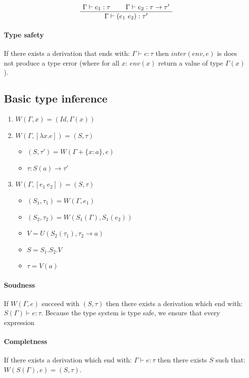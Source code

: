 \documentclass[a4paper]{report}
\newcommand{\ax}[1]%
{\AxiomC{$#1$}}
\newcommand{\bic}[1]%
{\BinaryInfC{$#1$}}
\newcommand{\drule}%
{\DisplayProof}
\begin{document}
\begin{equation}
\ax{\Gamma\vdash e_1:\tau}
\ax{\Gamma\vdash e_2:\tau\to\tau'}
\bic{\Gamma\vdash (e_1~e_2):\tau'}
\drule
\end{equation}

\paragraph{Type safety} If there exists a derivation that ends with: $\Gamma\vdash e:\tau$ then $inter(env,e)$ is does not produce a type error (where for all $x$: $env(x)$ return a value of type $\Gamma(x)$).

\subsection{Basic type inference}

\begin{enumerate}
\item $W(\Gamma,x)=(Id,\Gamma(x))$
\item $W(\Gamma,[\lambda x . e])=(S,\tau)$
	\begin{itemize}
	\item $(S,\tau')=W(\Gamma+\{x:a\},e)$
	\item $\tau:S(a)\to\tau'$
	\end{itemize}
\item $W(\Gamma,[e_1~e_2])=(S,\tau)$
	\begin{itemize}
	\item $(S_1,\tau_1)=W(\Gamma,e_1)$
	\item $(S_2,\tau_2)=W(S_1(\Gamma),S_1(e_2))$
	\item $V=U(S_2(\tau_1),\tau_2\to a)$
	\item $S=S_1.S_2.V$
	\item $\tau=V(a)$
	\end{itemize}
\end{enumerate}

\paragraph{Soudness} If $W(\Gamma,e)$ succeed with $(S,\tau)$ then there exists a derivation which end with: $S(\Gamma)\vdash e:\tau$. Because the type system is type safe, we ensure that every expression 

\paragraph{Completness} If there exists a derivation which end with: $\Gamma\vdash e:\tau$ then there exists $S$ such that: $W(S(\Gamma),e)=(S,\tau)$.
\end{document}
